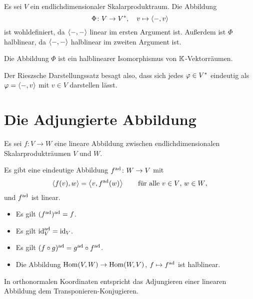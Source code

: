 Es sei $V$ ein endlichdimensionaler Skalarproduktraum.
Die Abbildung
\[
          \Phi
  \colon  V
  \to     V^*,
  \quad   v
  \mapsto \left\langle -, v \right\rangle
\]
ist wohldefiniert, da $\left\langle -, - \right\rangle$ linear im ersten Argument ist.
Außerdem ist $\Phi$ halblinear, da $\left\langle -, - \right\rangle$ halblinear im zweiten Argument ist.

\begin{theorem}
  \label{theorem: Riesz representation theorem}
  Die Abbildung $\Phi$ ist ein halblinearer Isomorphismus von $\mathbb{K}$-Vektorräumen.
\end{theorem}

Der Rieszsche Darstellungssatz besagt also, dass sich jedes $\varphi \in V^*$ eindeutig als $\varphi = \left\langle -, v \right\rangle$ mit $v \in V$ darstellen lässt.





\section{Die Adjungierte Abbildung}
\label{section: adjoint map for scalar products}

Es sei $f \colon V \to W$ eine lineare Abbildung zwischen endlichdimensionalen Skalarprodukträumen $V$ und $W$.

\begin{proposition}
  Es gibt eine eindeutige Abbildung $f^{\operatorname{ad}} \colon W \to V$ mit
  \begin{equation}
    \label{equation: definition of the adjoint map by elements for scalar products}
      \left\langle f(v), w \right\rangle
    = \left\langle v, f^{\operatorname{ad}}(w) \right\rangle
    \qquad
    \text{für alle $v \in V$, $w \in W$},
  \end{equation}
  und $f^{\operatorname{ad}}$ ist linear.
\end{proposition}

\begin{lemma}
  \leavevmode
  \begin{itemize}
    \item
      Es gilt $(f^{\operatorname{ad}})^{\operatorname{ad}} = f$.
    \item
      Es gilt $\operatorname{id}_V^{\operatorname{ad}} = \operatorname{id}_V$.
    \item
      Es gilt $(f \circ g)^{\operatorname{ad}} = g^{\operatorname{ad}} \circ f^{\operatorname{ad}}$.
    \item
      Die Abbildung $\operatorname{Hom}(V, W) \to \operatorname{Hom}(W, V)$, $f \mapsto f^{\operatorname{ad}}$ ist halblinear.
  \end{itemize}
\end{lemma}

In orthonormalen Koordinaten entspricht das Adjungieren einer linearen Abbildung dem Transponieren-Konjugieren.

